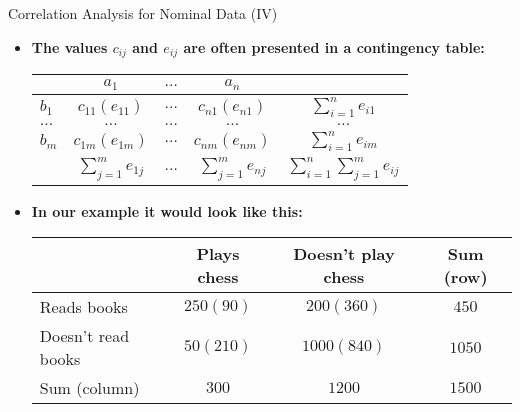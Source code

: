 \begin{frame}{Correlation Analysis for Nominal Data (IV)}
	\begin{itemize}
		\item \textbf{The values $c_{ij}$ and $e_{ij}$ are often presented in a
			      \color{airforceblue} contingency table:} \\
		      \begin{center}
			      \vspace{1mm}
			      \begin{tabular}{|l|c|c|c|c|}
				      \hline
				               & $a_1$                             & $\ldots$ & $a_n$             &
				      \\\hline
				      $b_1$    & $c_{11} (e_{11})$                 & $\ldots$ & $c_{n1} (e_{n1})$ &
				      $\sum_{i=1}^n e_{i1}$
				      \\\hline
				      $\ldots$ & $\ldots$                          & $\ldots$ & $\ldots$          & $\ldots$
				      \\\hline
				      $b_m$    & $c_{1m} (e_{1m})$                 & $\ldots$ & $c_{nm} (e_{nm})$ &
				      $\sum_{i=1}^n e_{im}$
				      \\\hline
				               & $\sum_{j=1}^m e_{1j}$             & $\ldots$ & $\sum_{j=1}^m
				      e_{nj}$  & $\sum_{i=1}^n\sum_{j=1}^m e_{ij}$
				      \\\hline
			      \end{tabular}
			      \vspace{2mm}
		      \end{center}
		      \vspace*{0.5cm}
		\item \textbf{In our example it would look like this:} \\
		      \begin{center}
			      \vspace{1mm}
			      \begin{tabular}{|l|c|c|c|}
				      \hline
				                         & Plays chess & Doesn't play chess & Sum (row)
				      \\\hline
				      Reads books        & $250 (90)$  & $200 (360)$        & $450$
				      \\\hline
				      Doesn't read books & $50 (210)$  & $1000 (840)$       &
				      $1050$
				      \\\hline
				      Sum (column)       & $300$       & $1200$             & $1500$
				      \\\hline
			      \end{tabular}
		      \end{center}
	\end{itemize}
\end{frame}

